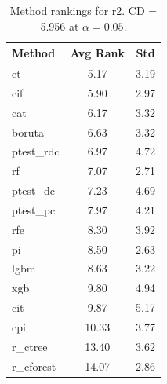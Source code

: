 \begin{table}[h]
\centering
\caption{Method rankings for r2. CD = 5.956 at $\alpha=0.05$.}
\label{tab:ranks_r2}
\begin{tabular}{lcc}
\toprule
Method & Avg Rank & Std \\
\midrule
et & 5.17 & 3.19 \\
cif & 5.90 & 2.97 \\
cat & 6.17 & 3.32 \\
boruta & 6.63 & 3.32 \\
ptest_rdc & 6.97 & 4.72 \\
rf & 7.07 & 2.71 \\
ptest_dc & 7.23 & 4.69 \\
ptest_pc & 7.97 & 4.21 \\
rfe & 8.30 & 3.92 \\
pi & 8.50 & 2.63 \\
lgbm & 8.63 & 3.22 \\
xgb & 9.80 & 4.94 \\
cit & 9.87 & 5.17 \\
cpi & 10.33 & 3.77 \\
r_ctree & 13.40 & 3.62 \\
r_cforest & 14.07 & 2.86 \\
\bottomrule
\end{tabular}
\end{table}